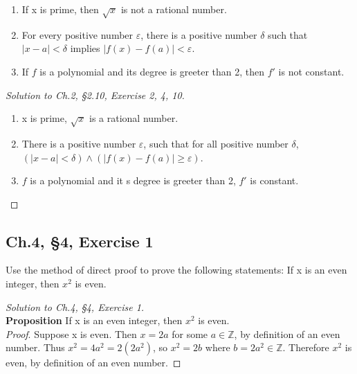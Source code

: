 \documentclass[12pt]{amsart}
\numberwithin{equation}{section}
\theoremstyle{definition}
\theoremstyle{remark}
\begin{document}
\begin{enumerate}

\item[2.]
If x is prime, then $ \sqrt{x} $ is not a rational number.

\item[4.]
For every positive number $ \varepsilon $, there is a positive number $ \delta $ such that $ |x-a| < \delta $ implies $ |f(x)-f(a)| < \varepsilon $.

\item[10.]
If $ f $ is a polynomial and its degree is greeter than 2, then $ f' $ is not constant.

\end{enumerate}


\begin{proof}[Solution to Ch.2, \S 2.10,  Exercise 2, 4, 10] \ \\

\begin{center}

\begin{enumerate}

\item[2.]
x is prime, $ \sqrt{x} $ is a rational number.

\item[4.]
There is a positive number $ \varepsilon $, such that for all positive number $ \delta $, $ (|x-a| < \delta) \land (|f(x)-f(a)| \geq \varepsilon) $.

\item[10.]
$ f $ is a polynomial and it s degree is greeter than 2, $ f' $ is constant.


\end{enumerate}

\end{center}

\end{proof}




\subsection*{Ch.4, \S 4,  Exercise 1}  Use the method of direct proof to prove the following statements: If x is an even integer, then $ x^2 $ is even.

\begin{proof}[Solution to Ch.4, \S 4,  Exercise 1]  \ \\
\textbf{Proposition}  If x is an even integer, then $ x^2 $ is even.\\
\textit{Proof}. Suppose x is even. Then $ x = 2a $ for some $ a \in \mathbb{Z} $, by definition of an even number. Thus $ x^2 = 4a^2 = 2(2a^2) $, so $ x^2 = 2b $ where $ b = 2a^2 \in \mathbb{Z} $. Therefore $ x^2 $ is even, by definition of an even number.


\end{proof}
\end{document}
